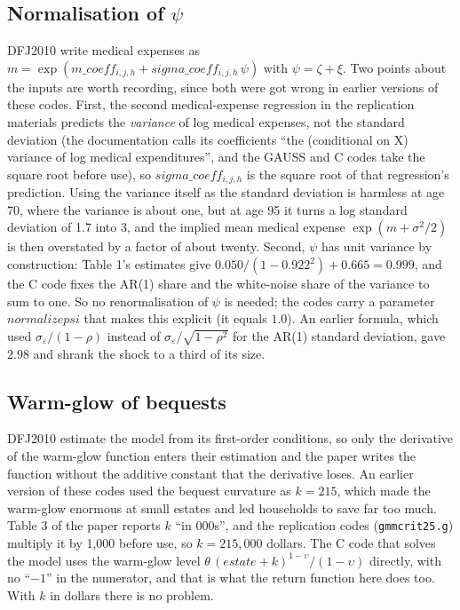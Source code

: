 \documentclass[11pt,fleqn]{article}
\begin{document}
\subsection{Normalisation of $\psi$}
DFJ2010 write medical expenses as $m=\exp(m\_{}coeff_{i,j,h}+sigma\_{}coeff_{i,j,h}\,\psi)$ with $\psi=\zeta+\xi$. Two points about the inputs are worth recording, since both were got wrong in earlier versions of these codes. First, the second medical-expense regression in the replication materials predicts the \emph{variance} of log medical expenses, not the standard deviation (the documentation calls its coefficients ``the (conditional on X) variance of log medical expenditures'', and the GAUSS and C codes take the square root before use), so $sigma\_{}coeff_{i,j,h}$ is the square root of that regression's prediction. Using the variance itself as the standard deviation is harmless at age 70, where the variance is about one, but at age 95 it turns a log standard deviation of 1.7 into 3, and the implied mean medical expense $\exp(m+\sigma^2/2)$ is then overstated by a factor of about twenty. Second, $\psi$ has unit variance by construction: Table 1's estimates give $0.050/(1-0.922^2)+0.665=0.999$, and the C code fixes the AR(1) share and the white-noise share of the variance to sum to one. So no renormalisation of $\psi$ is needed; the codes carry a parameter $normalizepsi$ that makes this explicit (it equals $1.0$). An earlier formula, which used $\sigma_\varepsilon/(1-\rho)$ instead of $\sigma_\varepsilon/\sqrt{1-\rho^2}$ for the AR(1) standard deviation, gave $2.98$ and shrank the shock to a third of its size.

\subsection{Warm-glow of bequests}
DFJ2010 estimate the model from its first-order conditions, so only the derivative of the warm-glow function enters their estimation and the paper writes the function without the additive constant that the derivative loses. An earlier version of these codes used the bequest curvature as $k=215$, which made the warm-glow enormous at small estates and led households to save far too much. Table 3 of the paper reports $k$ ``in 000s'', and the replication codes (\texttt{gmmcrit25.g}) multiply it by 1,000 before use, so $k=215{,}000$ dollars. The C code that solves the model uses the warm-glow level $\theta\,(estate+k)^{1-\upsilon}/(1-\upsilon)$ directly, with no ``$-1$'' in the numerator, and that is what the return function here does too. With $k$ in dollars there is no problem.
\end{document}
